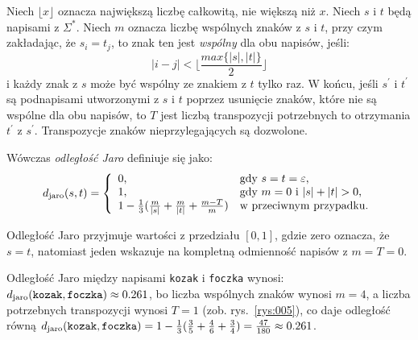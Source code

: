 \documentclass{praca1}
\begin{document}
\begin{definition}
Niech $\lfloor x \rfloor$ oznacza największą liczbę całkowitą, nie większą niż $x$. Niech $s$ i $t$ będą napisami z $\Sigma^*$. Niech $m$ oznacza liczbę wspólnych znaków z $s$ i $t$, przy czym zakładając, że $s_i = t_j$, to znak ten jest \emph{wspólny} dla obu napisów, jeśli:
\begin{equation*}
|i -j| < \Bigg\lfloor\frac{max\{|s|, |t|\}}{2}\Bigg\rfloor
\end{equation*}
i każdy znak z $s$ może być wspólny ze znakiem z $t$ tylko raz. W końcu, jeśli $s^\prime$ i $t^\prime$ są podnapisami utworzonymi z $s$ i $t$ poprzez usunięcie znaków, które nie są wspólne dla obu napisów, to $T$ jest liczbą transpozycji potrzebnych to otrzymania $t^\prime$ z $s^\prime$. Transpozycje znaków nieprzylegających są dozwolone.

Wówczas \emph{odległość Jaro} definiuje się jako:
\begin{equation}
\label{eq:011}
d_{\mathrm{jaro}}(s,t) = \left\{
\begin{array}{l l}     
    0, & \text{gdy } s = t = \varepsilon, \\
    1, & \text{gdy } m = 0 \text{ i } |s| + |t| > 0, \\
    1 - \frac{1}{3} (\frac{m}{|s|} + \frac{m}{|t|} + \frac{m - T}{m}) & \text{w przeciwnym przypadku}.
\end{array}\right.
\end{equation}
\end{definition}

Odległość Jaro przyjmuje wartości z przedziału $[0,1]$, gdzie zero oznacza, że $s = t$, natomiast jeden wskazuje na kompletną odmienność napisów z $m = T = 0$.

\begin{example}
Odległość Jaro między napisami \verb|kozak| i \verb|foczka| wynosi: $d_{\mathrm{jaro}}(\verb|kozak|, \verb|foczka|)  \approx 0.261$, bo liczba wspólnych znaków wynosi $m = 4$, a liczba potrzebnych transpozycji wynosi $T = 1$ (zob. rys.~\ref{rys:005}), co daje odległość równą $d_{\mathrm{jaro}}(\verb|kozak|, \verb|foczka|) = 1 - \frac{1}{3}(\frac{3}{5} + \frac{4}{6} + \frac{3}{4}) = \frac{47}{180} \approx 0.261$.
\end{example}
\end{document}
